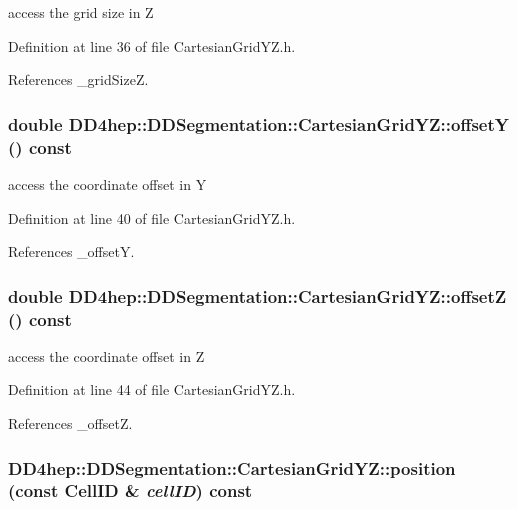 access the grid size in Z 

Definition at line 36 of file CartesianGridYZ.h.

References \_\-gridSizeZ.\hypertarget{class_d_d4hep_1_1_d_d_segmentation_1_1_cartesian_grid_y_z_aedee5c37ad16dbccc417e158c6c4d581}{
\subsubsection[{offsetY}]{\setlength{\rightskip}{0pt plus 5cm}double DD4hep::DDSegmentation::CartesianGridYZ::offsetY () const}}
\label{class_d_d4hep_1_1_d_d_segmentation_1_1_cartesian_grid_y_z_aedee5c37ad16dbccc417e158c6c4d581}


access the coordinate offset in Y 

Definition at line 40 of file CartesianGridYZ.h.

References \_\-offsetY.\hypertarget{class_d_d4hep_1_1_d_d_segmentation_1_1_cartesian_grid_y_z_a1e1a08a4a611d7cb799e2e6240bb06a4}{
\subsubsection[{offsetZ}]{\setlength{\rightskip}{0pt plus 5cm}double DD4hep::DDSegmentation::CartesianGridYZ::offsetZ () const}}
\label{class_d_d4hep_1_1_d_d_segmentation_1_1_cartesian_grid_y_z_a1e1a08a4a611d7cb799e2e6240bb06a4}


access the coordinate offset in Z 

Definition at line 44 of file CartesianGridYZ.h.

References \_\-offsetZ.\hypertarget{class_d_d4hep_1_1_d_d_segmentation_1_1_cartesian_grid_y_z_aaad4f014c52e680a4954971d75d13357}{
\subsubsection[{position}]{ DD4hep::DDSegmentation::CartesianGridYZ::position (const {\bf CellID} \& {\em cellID}) const}}
\label{class_d_d4hep_1_1_d_d_segmentation_1_1_cartesian_grid_y_z_aaad4f014c52e680a4954971d75d13357}


